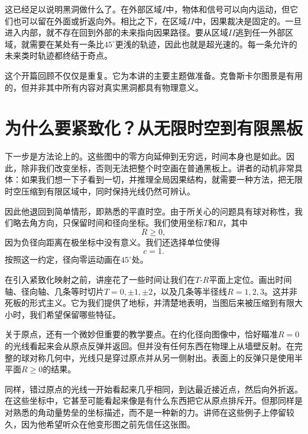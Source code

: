 这已经足以说明黑洞做什么了。在外部区域\(I\)中，物体和信号可以向内运动，但它们也可以留在外面或折返向外。相比之下，在区域\(II\)中，因果裁决是固定的。一旦进入内部，就不存在回到外部的未来指向因果路径。要从区域\(II\)逃到任一外部区域，就需要在某处有一条比\(45^\circ\)更浅的轨迹，因此也就是超光速的。每一条允许的未来类时轨迹都终结于奇点。

这个开篇回顾不仅仅是重复。它为本讲的主要主题做准备。克鲁斯卡尔图景是有用的，但并非其中所有内容对真实黑洞都具有物理意义。

\begin{classroomqa}
\end{classroomqa}

\section{为什么要紧致化？从无限时空到有限黑板}

下一步是方法论上的。这些图中的零方向延伸到无穷远，时间本身也是如此。因此，除非我们改变坐标，否则无法把整个时空画在普通黑板上。讲者的动机非常具体：如果我们想一下子看到一切，并推理全局因果结构，就需要一种方法，把无限时空压缩到有限区域中，同时保持光线仍然可辨认。

因此他退回到简单情形，即熟悉的平直时空。由于所关心的问题具有球对称性，我们略去角方向，只保留时间和径向坐标。我们使用坐标\(T\)和\(R\)，其中
\[
R\ge 0,
\]
因为负径向距离在极坐标中没有意义。我们还选择单位使得
\[
c=1.
\]
按照这一约定，径向零运动画在\(45^\circ\)处。

在引入紧致化映射之前，讲座花了一些时间让我们在\(T\)-\(R\)平面上定位。画出时间轴、径向轴、几条等时切片\(T=0,\pm1,\pm2\)，以及几条等半径线\(R=1,2,3\)。这并非死板的形式主义。它为我们提供了地标，并清楚地表明，当图后来被压缩到有限大小时，我们希望保留哪些特征。

关于原点，还有一个微妙但重要的教学要点。在约化径向图像中，恰好瞄准\(R=0\)的光线看起来会从原点反弹并返回。但并没有任何东西在物理上从墙壁反射。在完整的球对称几何中，光线只是穿过原点并从另一侧射出。表面上的反弹只是使用半平面\(R\ge 0\)的结果。

同样，错过原点的光线一开始看起来几乎相同，到达最近接近点，然后向外折返。在这些坐标中，它甚至可能看起来像是有什么东西把它从原点排斥开。但那同样是对熟悉的角动量势垒的坐标描述，而不是一种新的力。讲师在这些例子上停留较久，因为他希望听众在他变形图之前先信任这张图。

